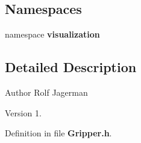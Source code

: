 \subsection*{Namespaces}
\begin{DoxyCompactItemize}
\item 
namespace {\bf visualization}
\end{DoxyCompactItemize}


\subsection{Detailed Description}
\begin{DoxyAuthor}{Author}
Rolf Jagerman 
\end{DoxyAuthor}
\begin{DoxyVersion}{Version}
1. 
\end{DoxyVersion}


Definition in file {\bf Gripper.\-h}.

